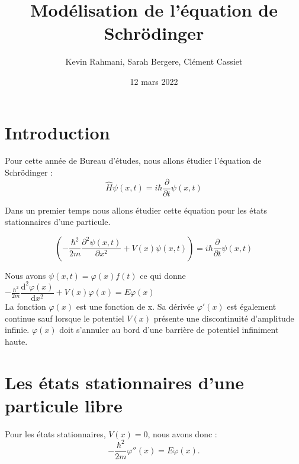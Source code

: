 \documentclass[11pt]{report}
\title{Modélisation de l'équation de Schrödinger}
\author{Kevin Rahmani, Sarah Bergere, Clément Cassiet}
\date{12 mars 2022}
\begin{document}
\maketitle

\tableofcontents

\newpage
\section{Introduction}

Pour cette année de Bureau d'études, nous allons étudier l'équation de Schrödinger :
\begin{equation}
\hat{H}\psi(x,t) = i\hbar\dfrac{\partial}{\partial t}\psi(x,t) 
\end{equation}

Dans un premier temps nous allons étudier cette équation pour les états stationnaires d'une particule.

\begin{equation}
(-\frac{\hbar^2}{2m}\frac{\partial^2 \psi(x,t)}{\partial x^2}  + V(x) \psi(x,t))= i\hbar\dfrac{\partial}{\partial t}\psi(x,t) 
\end{equation}

Nous avons $\psi(x,t) = \varphi(x)f(t)$ ce qui donne $-\frac{\hbar^2}{2m}\dfrac{\mathrm{d}^2 \varphi(x)}{\mathrm{d} x^2}  + V(x) \varphi(x)= E\varphi(x)$ \\

La fonction $\varphi(x)$ est une fonction de x. Sa dérivée $\varphi'(x)$ est également continue sauf lorsque le potentiel $V(x)$ présente une discontinuité d’amplitude infinie. $\varphi(x)$ doit s’annuler au bord d’une barrière de potentiel infiniment haute.

\newpage
\section{Les états stationnaires d'une particule libre}

Pour les états stationnaires, $V(x)=0$, nous avons donc :
\begin{equation} \label{equation1}
-\frac{\hbar^2}{2m}\varphi''(x) = E\varphi(x).
\end{equation} 
\end{document}
